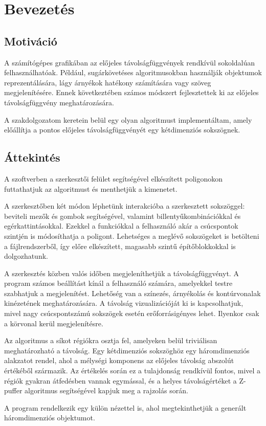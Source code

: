 \chapter{Bevezetés}
\label{ch:intro}

\section{Motiváció}\label{sec:motivacio}
A számítógépes grafikában az előjeles távolságfüggvények rendkívül sokoldalúan felhasználhatóak. Például, sugárkövetéses algoritmusokban használják objektumok reprezentálására, lágy árnyékok hatékony számítására vagy szöveg megjelenítésére. Ennek következtében számos módszert fejlesztettek ki az előjeles távolságfüggvény meghatározására.

A szakdolgozatom keretein belül egy olyan algoritmust implementáltam, amely előállítja a pontos előjeles távolságfüggvényét egy kétdimenziós sokszögnek.

\section{Áttekintés}\label{sec:attekintes}
A szoftverben a szerkesztői felület segítségével elkészített poligonokon futtathatjuk az algoritmust és menthetjük a kimenetet.

A szerkesztőben két módon léphetünk interakcióba a szerkesztett sokszöggel: beviteli mezők és gombok segítségével, valamint billentyűkombinációkkal és egérkattintásokkal. Ezekkel a funkciókkal a felhasználó akár a csúcspontok szintjén is módosíthatja a poligont. Lehetséges a meglévő sokszögeket is betölteni a fájlrendszerből, így előre elkészített, magasabb szintű építőblokkokkal is dolgozhatunk.

A szerkesztés közben valós időben megjeleníthetjük a távolságfüggvényt. A program számos beállítást kínál a felhasználó számára, amelyekkel testre szabhatjuk a megjelenítést. Lehetőség van a színezés, árnyékolás és kontúrvonalak kinézetének meghatározására. A távolság vizualizációját ki is kapcsolhatjuk, mivel nagy csúcspontszámú sokszögek esetén erőforrásigényes lehet. Ilyenkor csak a körvonal kerül megjelenítésre.

Az algoritmus a síkot régiókra osztja fel, amelyeken belül triviálisan meghatározható a távolság. Egy kétdimenziós sokszöghöz egy háromdimenziós alakzatot rendel, ahol a mélységi komponens az előjeles távolság abszolút értékéből származik. Az értékelés során ez a tulajdonság rendkívül fontos, mivel a régiók gyakran átfedésben vannak egymással, és a helyes távolságértéket a Z-puffer algoritmus segítségével kapjuk meg a rajzolás során.

A program rendelkezik egy külön nézettel is, ahol megtekinthetjük a generált háromdimenziós objektumot.
